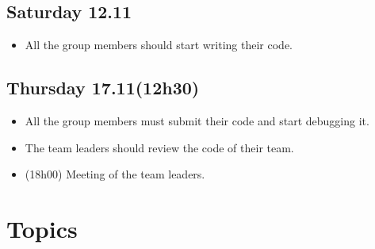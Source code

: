 \documentclass[12pt]{article}
\begin{document}
\subsection{Saturday 12.11}
\begin{itemize}[label=$\bullet$]
    \item All the group members should start writing their code.
\end{itemize}

\subsection{Thursday 17.11\small{(12h30)}}
\begin{itemize}[label=$\bullet$]
    \item All the group members must submit their code and start debugging it. 
    \item The team leaders should review the code of their team.
    \item {\footnotesize{(18h00)}} Meeting of the team leaders.
\end{itemize}

\section{Topics}
\end{document}

